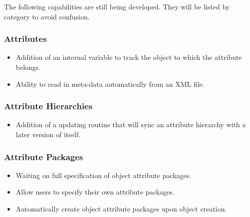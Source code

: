 %

The following capabilities are still being developed.  They will be listed by category to avoid confusion.
 
\subsubsection{Attributes}

\begin{itemize}
\item Addition of an internal variable to track the object to which the attribute belongs.
\item Ability to read in meta-data automatically from an XML file.
\end{itemize}

\subsubsection{Attribute Hierarchies}

\begin{itemize}
\item Addition of a updating routine that will sync an attribute hierarchy with a later version of itself.
\end{itemize}

\subsubsection{Attribute Packages}

\begin{itemize}
\item Waiting on full specification of object attribute packages.
\item Allow users to specify their own attribute packages.
\item Automatically create object attribute packages upon object creation.
\end{itemize}
